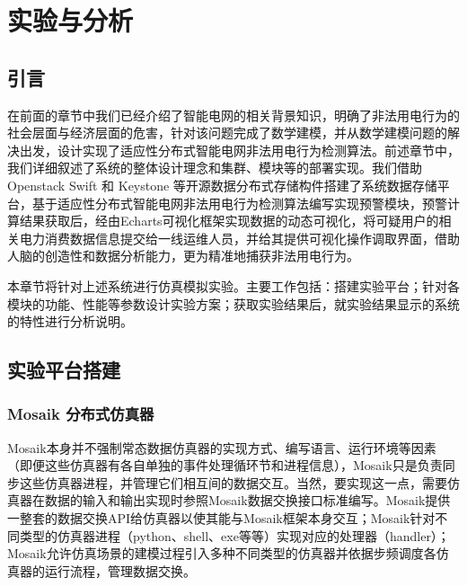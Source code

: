 
\raggedbottom
\chapter{实验与分析}
\label{chap:evaluation}

\section{引言}

在前面的章节中我们已经介绍了智能电网的相关背景知识，明确了非法用电行为的社会层面与经济层面的危害，针对该问题完成了数学建模，并从数学建模问题的解决出发，设计实现了适应性分布式智能电网非法用电行为检测算法。前述章节中，我们详细叙述了系统的整体设计理念和集群、模块等的部署实现。我们借助Openstack Swift 和 Keystone 等开源数据分布式存储构件搭建了系统数据存储平台，基于适应性分布式智能电网非法用电行为检测算法编写实现预警模块，预警计算结果获取后，经由Echarts可视化框架实现数据的动态可视化，将可疑用户的相关电力消费数据信息提交给一线运维人员，并给其提供可视化操作调取界面，借助人脑的创造性和数据分析能力，更为精准地捕获非法用电行为。

本章节将针对上述系统进行仿真模拟实验。主要工作包括：搭建实验平台；针对各模块的功能、性能等参数设计实验方案；获取实验结果后，就实验结果显示的系统的特性进行分析说明。

\section{实验平台搭建}

\subsection{Mosaik 分布式仿真器}



Mosaik本身并不强制常态数据仿真器的实现方式、编写语言、运行环境等因素（即便这些仿真器有各自单独的事件处理循环节和进程信息），Mosaik只是负责同步这些仿真器进程，并管理它们相互间的数据交互。当然，要实现这一点，需要仿真器在数据的输入和输出实现时参照Mosaik数据交换接口标准编写。Mosaik提供一整套的数据交换API给仿真器以使其能与Mosaik框架本身交互；Mosaik针对不同类型的仿真器进程（python、shell、exe等等）实现对应的处理器（handler）；Mosaik允许仿真场景的建模过程引入多种不同类型的仿真器并依据步频调度各仿真器的运行流程，管理数据交换。

